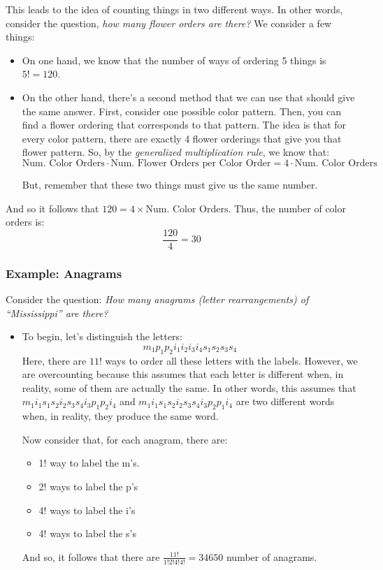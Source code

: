 \documentclass[letterpaper]{article}
\begin{document}
\begin{itemize}
    This leads to the idea of counting things in two different ways. In other words, consider the question, \emph{how many flower orders are there?} We consider a few things:
    \begin{itemize}
        \item On one hand, we know that the number of ways of ordering 5 things is $5! = 120$. 
        \item On the other hand, there's a second method that we can use that should give the same answer. First, consider one possible color pattern. Then, you can find a flower ordering that corresponds to that pattern. The idea is that for every color pattern, there are exactly 4 flower orderings that give you that flower pattern. So, by the \emph{generalized multiplication rule}, we know that:
        \[ \text{Num. Color Orders} \cdot \text{Num. Flower Orders per Color Order} = 4 \cdot \text{Num. Color Orders} \]
    
        But, remember that these two things must give us the same number. 
    \end{itemize}
    And so it follows that $120 = 4 \times \text{Num. Color Orders}$. Thus, the number of color orders is:
    \[\frac{120}{4} = \boxed{30}\]
\end{itemize}

\subsubsection{Example: Anagrams}
Consider the question: \emph{How many anagrams (letter rearrangements) of ``Mississippi'' are there?}

\begin{itemize}
    \item To begin, let's distinguish the letters:
    \[ m_1 p_1 p_2 i_1 i_2 i_3 i_4 s_1 s_2 s_3 s_4\]
    Here, there are $11!$ ways to order all these letters with the labels. However, we are overcounting because this assumes that each letter is different when, in reality, some of them are actually the same. In other words, this assumes that $m_1 i_1 s_1 s_2 i_2 s_3 s_4 i_3 p_1 p_2 i_4$ and $m_1 i_1 s_1 s_2 i_2 s_3 s_4 i_3 p_2 p_1 i_4$ are two different words when, in reality, they produce the same word.  
    
    \bigskip 
    
    Now consider that, for each anagram, there are:
    \begin{itemize}
        \item 1! way to label the m's.
        \item 2! ways to label the p's
        \item 4! ways to label the i's 
        \item 4! ways to label the s's
    \end{itemize}
    
    And so, it follows that there are $\frac{11!}{1!2!4!4!} = \boxed{34650}$ number of anagrams.
\end{itemize}
\end{document}
